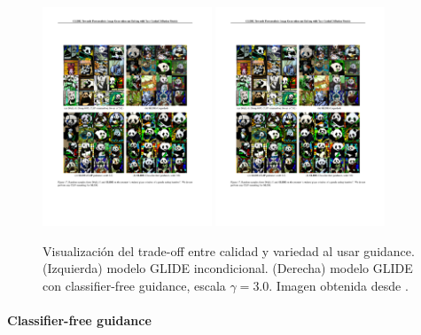 
\begin{figure}
    \centering
    \includegraphics[width=0.45\textwidth]{images/dm/glide_unconditional}
    \includegraphics[width=0.45\textwidth]{images/dm/glide_guidance}
    \caption{Visualización del trade-off entre calidad y variedad al usar guidance. (Izquierda) modelo GLIDE incondicional. (Derecha) modelo GLIDE con classifier-free guidance, escala $\gamma=3.0$. Imagen obtenida desde \cite{nichol2022glidephotorealisticimagegeneration}.}
    \label{fig:glide}
\end{figure}

\paragraph{Classifier-free guidance}

